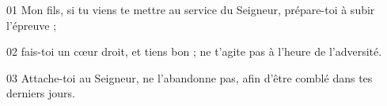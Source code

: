 01 Mon fils, si tu viens te mettre au service du Seigneur, prépare-toi à subir l’épreuve ;

02 fais-toi un cœur droit, et tiens bon ; ne t’agite pas à l’heure de l’adversité.

03 Attache-toi au Seigneur, ne l’abandonne pas, afin d’être comblé dans tes derniers jours.

